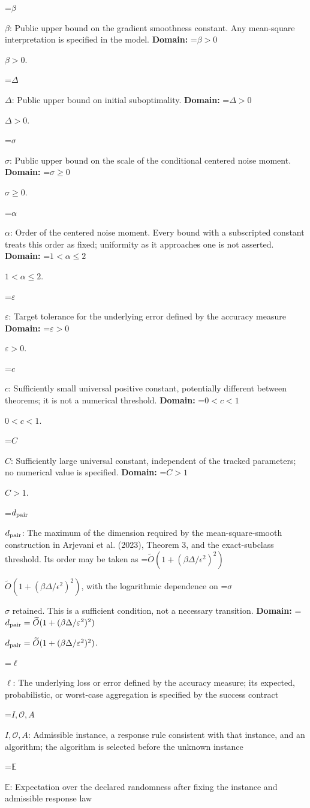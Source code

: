 \documentclass[10pt,a4paper]{article}
\newcommand{\AtlasMath}[1]{\par\begingroup\centering\setbox0=\hbox{$\displaystyle #1$}\ifdim\wd0>1.4\linewidth\typeout{ATLAS WIDE FORMULA: \the\wd0}\fi\ifdim\wd0>\linewidth\resizebox{\linewidth}{!}{\box0}\else\box0\fi\par\endgroup}
\newcommand{\AtlasInlineMath}[1]{\begingroup\setbox0=\hbox{$#1$}\ifdim\wd0>.4\linewidth\endgroup\AtlasMath{#1}\else\endgroup$#1$\fi}
\begin{document}
\AtlasInlineMath{\beta}: Public upper bound on the gradient smoothness constant. Any mean-square interpretation is specified in the model. \textbf{Domain:} \AtlasInlineMath{\beta>0}.

\AtlasInlineMath{\Delta}: Public upper bound on initial suboptimality. \textbf{Domain:} \AtlasInlineMath{\Delta>0}.

\AtlasInlineMath{\sigma}: Public upper bound on the scale of the conditional centered noise moment. \textbf{Domain:} \AtlasInlineMath{\sigma\ge0}.

\AtlasInlineMath{\alpha}: Order of the centered noise moment. Every bound with a subscripted constant treats this order as fixed; uniformity as it approaches one is not asserted. \textbf{Domain:} \AtlasInlineMath{1<\alpha\le2}.

\AtlasInlineMath{\varepsilon}: Target tolerance for the underlying error defined by the accuracy measure \textbf{Domain:} \AtlasInlineMath{\varepsilon>0}.

\AtlasInlineMath{c}: Sufficiently small universal positive constant, potentially different between theorems; it is not a numerical threshold. \textbf{Domain:} \AtlasInlineMath{0<c<1}.

\AtlasInlineMath{C}: Sufficiently large universal constant, independent of the tracked parameters; no numerical value is specified. \textbf{Domain:} \AtlasInlineMath{C>1}.

\AtlasInlineMath{d_{\rm pair}}: The maximum of the dimension required by the mean-square-smooth construction in Arjevani et al. (2023), Theorem 3, and the exact-subclass threshold. Its order may be taken as \AtlasInlineMath{\widetilde O(1+(\beta\Delta/\epsilon^2)^2)}, with the logarithmic dependence on \AtlasInlineMath{\sigma} retained. This is a sufficient condition, not a necessary transition. \textbf{Domain:} \AtlasInlineMath{d_{\rm pair}=\widetilde{O}(1+(\beta\Delta/\varepsilon^2)^2)}.

\AtlasInlineMath{\ell}: The underlying loss or error defined by the accuracy measure; its expected, probabilistic, or worst-case aggregation is specified by the success contract

\AtlasInlineMath{I,\mathcal{O},A}: Admissible instance, a response rule consistent with that instance, and an algorithm; the algorithm is selected before the unknown instance

\AtlasInlineMath{\mathbb{E}}: Expectation over the declared randomness after fixing the instance and admissible response law
\end{document}
